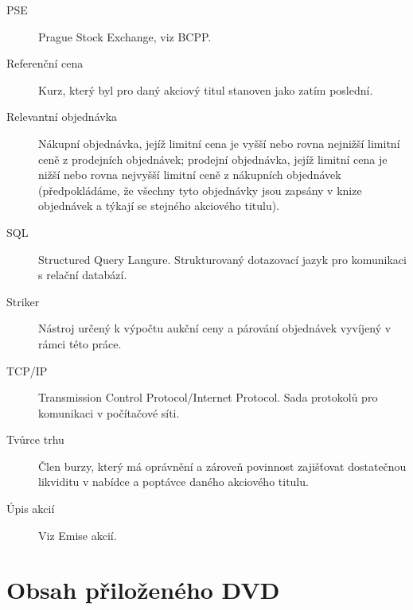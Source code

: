 \documentclass[thesis=M,czech]{FITthesis}[2012/06/26]
\begin{document}
\begin{description}
	\item[PSE] Prague Stock Exchange, viz BCPP.
	\item[Referenční cena] Kurz, který byl pro daný akciový titul stanoven jako zatím poslední. 
	\item[Relevantní objednávka] Nákupní objednávka, jejíž limitní cena je vyšší nebo rovna nejnižší limitní ceně z prodejních objednávek;
					prodejní objednávka, jejíž limitní cena je nižší nebo rovna nejvyšší limitní ceně z nákupních objednávek 
					(předpokládáme, že všechny tyto objednávky jsou zapsány v knize objednávek a týkají se stejného akciového titulu).
	\item[SQL] Structured Query Langure. Strukturovaný dotazovací jazyk pro komunikaci s relační databází.
	\item[Striker] Nástroj určený k výpočtu aukční ceny a párování objednávek vyvíjený v rámci této práce.
	\item[TCP/IP] Transmission Control Protocol/Internet Protocol. Sada protokolů pro komunikaci v počítačové síti.
	\item[Tvůrce trhu] Člen burzy, který má oprávnění a zároveň povinnost zajišťovat dostatečnou likviditu v nabídce a poptávce daného akciového titulu.
	\item[Úpis akcií] Viz Emise akcií. 
\end{description}



\chapter{Obsah přiloženého DVD}

\begin{figure}
\end{figure}
\end{document}
